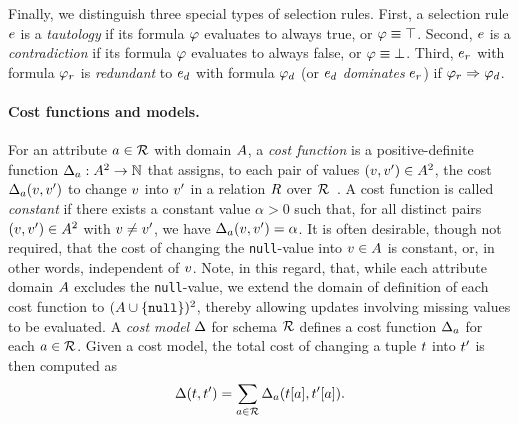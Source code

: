 Finally, we distinguish three special types of selection rules.
First, a selection rule $e$ is a \emph{tautology} if its formula $\varphi$ evaluates to always true, or $\varphi \equiv \top$.
Second, $e$ is a \emph{contradiction} if its formula $\varphi$ evaluates to always false, or $\varphi \equiv \bot$.
Third, $e_r$ with formula $\varphi_{r}$ is \emph{redundant} to $e_d$ with formula $\varphi_{d}$ (or $e_d$ \emph{dominates} $e_r$) if $\varphi_r \Rightarrow \varphi_d$.


\paragraph{Cost functions and models.}
For an attribute $a \in \mathcal{R}$ with domain $A$, a \emph{cost function} is a positive-definite function $\Delta_{a} : A^2 \rightarrow \mathbb{N}$ that assigns, to each pair of values $(v, v') \in A^2$, the cost $\Delta_{a}(v,v')$ to change $v$ into $v'$ in a relation $R$ over $\mathcal{R}$~\cite{Bronselaer2023}.
A cost function is called \emph{constant} if there exists a constant value $\alpha > 0$ such that, for all distinct pairs $(v, v') \in A^2$ with $v \neq v'$, we have $\Delta_{a}(v,v') = \alpha$.
It is often desirable, though not required, that the cost of changing the \texttt{null}-value into $v \in A$ is constant, or, in other words, independent of $v$.
Note, in this regard, that, while each attribute domain $A$ excludes the \texttt{null}-value,
we extend the domain of definition of each cost function to $(A \cup\{\texttt{null}\})^2$, thereby allowing updates involving missing values to be evaluated.
A \emph{cost model} $\Delta$ for schema $\mathcal{R}$ defines a cost function $\Delta_{a}$ for each $a \in \mathcal{R}$.
Given a cost model, the total cost of changing a tuple $t$ into $t'$ is then computed as
\begin{equation}
    \label{eq:costmodel}
    \Delta(t,t') = \sum_{a \in \mathcal{R}} \Delta_{a}(t[a],t'[a]).
\end{equation}
